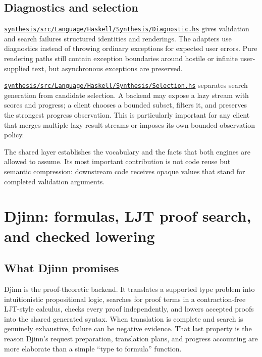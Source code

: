 \documentclass[10pt,letterpaper,oneside]{report}
\def\DjexBase{https://github.com/VladimirReshetnikov/Djex/blob/d3d9662598460316bdcd177ce6768c521e764aa8/}
\newcommand{\dpath}[1]{\href{\DjexBase#1}{\nolinkurl{#1}}}
\begin{document}
\section{Diagnostics and selection}

\dpath{synthesis/src/Language/Haskell/Synthesis/Diagnostic.hs} gives validation and search failures structured identities and renderings. The adapters use diagnostics instead of throwing ordinary exceptions for expected user errors. Pure rendering paths still contain exception boundaries around hostile or infinite user-supplied text, but asynchronous exceptions are preserved.

\dpath{synthesis/src/Language/Haskell/Synthesis/Selection.hs} separates search generation from candidate selection. A backend may expose a lazy stream with scores and progress; a client chooses a bounded subset, filters it, and preserves the strongest progress observation. This is particularly important for any client that merges multiple lazy result streams or imposes its own bounded observation policy.

\begin{summarybox}
The shared layer establishes the vocabulary and the facts that both engines are allowed to assume. Its most important contribution is not code reuse but semantic compression: downstream code receives opaque values that stand for completed validation arguments.
\end{summarybox}

\chapter{Djinn: formulas, LJT proof search, and checked lowering}\label{ch:djinn}

\section{What Djinn promises}

Djinn is the proof-theoretic backend. It translates a supported type problem into intuitionistic propositional logic, searches for proof terms in a contraction-free LJT-style calculus, checks every proof independently, and lowers accepted proofs into the shared generated syntax. When translation is complete and search is genuinely exhaustive, failure can be negative evidence. That last property is the reason Djinn's request preparation, translation plans, and progress accounting are more elaborate than a simple ``type to formula'' function.
\end{document}
